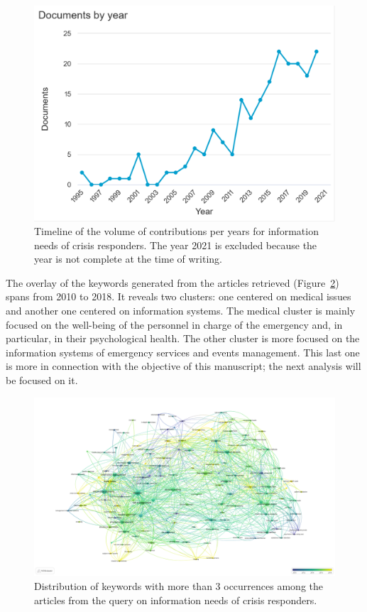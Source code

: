 \begin{figure}[htb]
    \centering
    \includegraphics[width=\textwidth]{figures/chap-2/business-needs-hist.pdf}
    \caption{Timeline of the volume of contributions per years for information needs of crisis responders. The year 2021 is excluded because the year is not complete at the time of writing.}
    \label{literature:business-needs-hist}
\end{figure}

The overlay of the keywords generated from the articles retrieved (Figure~\ref{literature:business-needs-overlay}) spans from 2010 to 2018.
It reveals two clusters: one centered on medical issues and another one centered on information systems.
The medical cluster is mainly focused on the well-being of the personnel in charge of the emergency and, in particular, in their psychological health.
The other cluster is more focused on the information systems of emergency services and events management.
This last one is more in connection with the objective of this manuscript; the next analysis will be focused on it.

\begin{landscape}
    \begin{figure}[htb]
        \includegraphics[width=\paperwidth,height=\paperheight,keepaspectratio]{figures/chap-2/business-needs-overlay.pdf}
        \caption{Distribution of keywords with more than 3 occurrences among the articles from the query on information needs of crisis responders.}
        \label{literature:business-needs-overlay}
    \end{figure}
\end{landscape}

